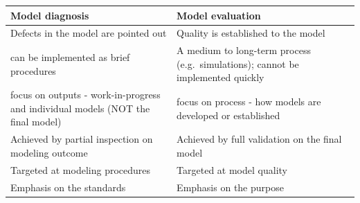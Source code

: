 \documentclass[
  10pt,
]{krantz}
\begin{document}
\begin{longtable}[]{@{}ll@{}}
\toprule
\begin{minipage}[b]{0.47\columnwidth}\raggedright
Model diagnosis\strut
\end{minipage} & \begin{minipage}[b]{0.47\columnwidth}\raggedright
Model evaluation\strut
\end{minipage}\tabularnewline
\midrule
\endhead
\begin{minipage}[t]{0.47\columnwidth}\raggedright
Defects in the model are pointed out\strut
\end{minipage} & \begin{minipage}[t]{0.47\columnwidth}\raggedright
Quality is established to the model\strut
\end{minipage}\tabularnewline
\begin{minipage}[t]{0.47\columnwidth}\raggedright
can be implemented as brief procedures\strut
\end{minipage} & \begin{minipage}[t]{0.47\columnwidth}\raggedright
A medium to long-term process (e.g.~simulations); cannot be implemented quickly\strut
\end{minipage}\tabularnewline
\begin{minipage}[t]{0.47\columnwidth}\raggedright
focus on outputs - work-in-progress and individual models (NOT the final model)\strut
\end{minipage} & \begin{minipage}[t]{0.47\columnwidth}\raggedright
focus on process - how models are developed or established\strut
\end{minipage}\tabularnewline
\begin{minipage}[t]{0.47\columnwidth}\raggedright
Achieved by partial inspection on modeling outcome\strut
\end{minipage} & \begin{minipage}[t]{0.47\columnwidth}\raggedright
Achieved by full validation on the final model\strut
\end{minipage}\tabularnewline
\begin{minipage}[t]{0.47\columnwidth}\raggedright
Targeted at modeling procedures\strut
\end{minipage} & \begin{minipage}[t]{0.47\columnwidth}\raggedright
Targeted at model quality\strut
\end{minipage}\tabularnewline
\begin{minipage}[t]{0.47\columnwidth}\raggedright
Emphasis on the standards\strut
\end{minipage} & \begin{minipage}[t]{0.47\columnwidth}\raggedright
Emphasis on the purpose\strut
\end{minipage}\tabularnewline
\bottomrule
\end{longtable}
\end{document}
